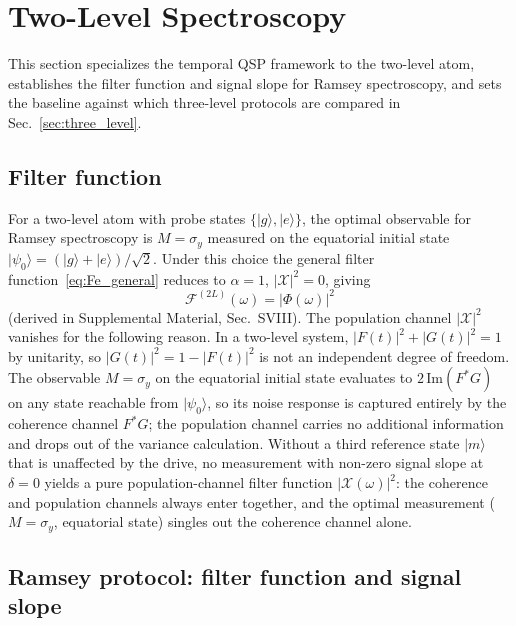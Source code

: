 \documentclass[aps,pra,twocolumn,superscriptaddress,longbibliography]{revtex4-2}
\newcommand{\be}{\begin{equation}}
\newcommand{\ee}{\end{equation}}
\begin{document}
\section{Two-Level Spectroscopy}
\label{sec:two_level}

This section specializes the temporal QSP framework to the two-level atom,
establishes the filter function and signal slope for Ramsey spectroscopy,
and sets the baseline against which three-level protocols are compared in
Sec.~\ref{sec:three_level}.

\subsection{Filter function}
\label{sec:two_level_ff}

For a two-level atom with probe states $\{|g\rangle,|e\rangle\}$, the optimal
observable for Ramsey spectroscopy is $M = \sigma_y$ measured on the equatorial
initial state $|\psi_0\rangle = (|g\rangle + |e\rangle)/\sqrt{2}$.
Under this choice the general filter function~\eqref{eq:Fe_general}
reduces to $\alpha=1$, $|\mathcal{X}|^2=0$, giving
\be
  \mathcal{F}^{(2L)}(\omega) = |\Phi(\omega)|^2
  \label{eq:Fe_2L}
\ee
(derived in Supplemental Material, Sec.~SVIII).
The population channel $|\mathcal{X}|^2$ vanishes for the following reason.
In a two-level system, $|F(t)|^2 + |G(t)|^2 = 1$ by unitarity, so
$|G(t)|^2 = 1 - |F(t)|^2$ is not an independent degree of freedom.
The observable $M = \sigma_y$ on the equatorial initial state evaluates to
$2\,\mathrm{Im}(F^*G)$ on any state reachable from $|\psi_0\rangle$, so its
noise response is captured entirely by the coherence channel $F^*G$;
the population channel carries no additional information and drops out of
the variance calculation.
Without a third reference state $|m\rangle$ that is unaffected by the drive,
no measurement with non-zero signal slope at $\delta=0$ yields a pure
population-channel filter function $|\mathcal{X}(\omega)|^2$: the coherence
and population channels always enter together, and the optimal measurement
($M = \sigma_y$, equatorial state) singles out the coherence channel alone.

\subsection{Ramsey protocol: filter function and signal slope}
\label{sec:ramsey}
\end{document}
